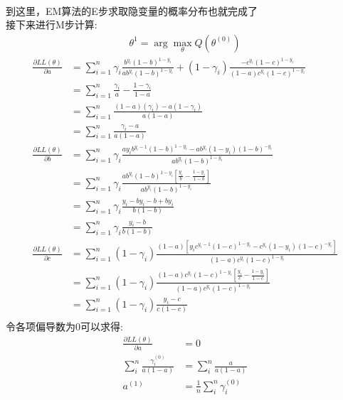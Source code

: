 \documentclass[answers]{exam}  %
\begin{document}
\begin{questions}
\begin{solution}
\begin{parts}
\begin{align*}
		    	\end{align*}
	    		到这里，EM算法的E步求取隐变量的概率分布也就完成了\\
	    		接下来进行M步计算:
	    		\begin{align*}
	    			\theta^1 = \arg \max_\theta Q(\theta^{(0)})
	    		\end{align*}
	    		\begin{align*}
	    			\frac{\partial LL(\theta)}{\partial a} &= \sum_{i=1}^n  \gamma_i \frac{b^{y_i} (1-b)^{1-y_i}}{a b^{y_i} (1-b)^{1-y_i}} + (1 - \gamma_i) \frac{-c^{y_i} (1-c)^{1-y_i}}{(1-a) c^{y_i} (1-c)^{1-y_i}} \\
	    			&= \sum_{i=1}^n \frac{\gamma_i}{a} - \frac{1-\gamma_i}{1-a} \\
	    			&= \sum_{i=1}^n \frac{(1-a)(\gamma_i) - a(1-\gamma_i)}{a(1-a)} \\
	    			&= \sum_{i=1}^n  \frac{\gamma_i - a}{a(1-a)} \\
	    			\frac{\partial LL(\theta)}{\partial b} &= \sum_{i=1}^n \gamma_i \frac{a y_i b^{y_i-1} (1-b)^{1-y_i} - ab^{y_i} (1-y_i) (1-b)^{-y_i}}{a b^{y_i} (1-b)^{1-y_i}} \\
	    			&= \sum_{i=1}^n \gamma_i \frac{ab^{y_i}(1-b)^{1-y_i} [\frac{y_i}{b} - \frac{1-y_i}{1-b}]}{a b^{y_i} (1-b)^{1-y_i}}\\
	    			&= \sum_{i=1}^n \gamma_i \frac{y_i - by_i - b  + by_i}{b(1-b)}\\
	    			&= \sum_{i=1}^n \gamma_i \frac{y_i - b  }{b(1-b)}\\
	    			\frac{\partial LL(\theta)}{\partial c} &= \sum_{i=1}^n (1-\gamma_i) \frac{(1-a) [y_i c^{y_i-1} (1-c)^{1-y_i} - c^{y_i} (1-y_i) (1-c)^{-y_i}] }{(1-a) c^{y_i} (1-c)^{1-y_i}}\\
	    			&= \sum_{i=1}^n (1-\gamma_i) \frac{(1-a) c^{y_i} (1-c)^{1-y_i} [\frac{y_i}{c} - \frac{1-y_i}{1-c}] }{(1-a) c^{y_i} (1-c)^{1-y_i}} \\
	    			&= \sum_{i=1}^n (1-\gamma_i) \frac{y_i - c  }{c(1-c)}\\ 
	    		\end{align*}
				令各项偏导数为0可以求得:
				\begin{align*}
					\frac{\partial LL(\theta)}{\partial a} &= 0\\
					\sum_{i}^n \frac{\gamma_i^{(0)} }{a(1-a)} &= \sum_{i}^n \frac{a}{a(1-a)} \\
					a^{(1)} &= \frac{1}{n} \sum_{i}^n \gamma_i^{(0)} 
				\end{align*}
				\begin{align*}

\end{align*}
\end{parts}
\end{solution}
\end{questions}
\end{document}
